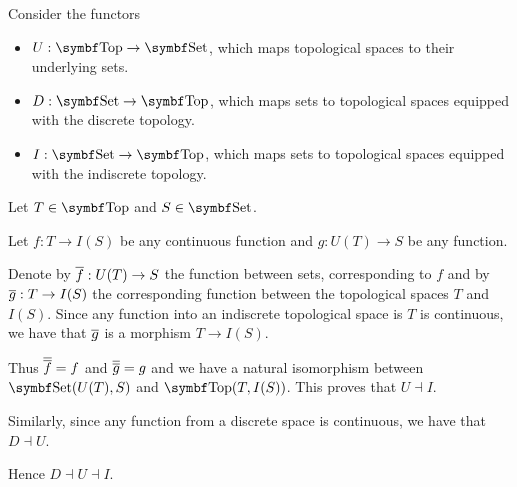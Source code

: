 \begin{example}\label{ex:top_adjoint_functor}\cite[example 2.1.5]{Leinster2014}
  Consider the functors
  \begin{itemize}
    \item \( U: \Cat{Top} \to \Bold{Set} \), which maps topological spaces to their underlying sets.
    \item \( D: \Cat{Set} \to \Bold{Top} \), which maps sets to topological spaces equipped with the discrete topology.
    \item \( I: \Cat{Set} \to \Bold{Top} \), which maps sets to topological spaces equipped with the indiscrete topology.
  \end{itemize}

  Let \( T \in \Cat{Top} \) and \( S \in \Bold{Set} \).

  Let \( f: T \to I(S) \) be any continuous function and \( g: U(T) \to S \) be any function.

  Denote by \( \overline{f}: U(T) \to S \) the function between sets, corresponding to \( f \) and by \( \overline{g}: T \to I(S) \) the corresponding function between the topological spaces \( T \) and \( I(S) \). Since any function into an indiscrete topological space is \( T \) is continuous, we have that \( \overline{g} \) is a morphism \( T \to I(S) \).

  Thus \( \overline{\overline{f}} = f \) and \( \overline{\overline{g}} = g \) and we have a natural isomorphism between \( \Cat{Set}(U(T), S) \) and \( \Bold{Top}(T, I(S)) \). This proves that \( U \dashv I \).

  Similarly, since any function from a discrete space is continuous, we have that \( D \dashv U \).

  Hence \( D \dashv U \dashv I \).
\end{example}
